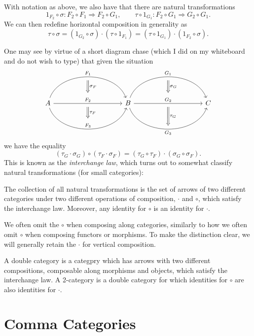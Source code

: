 With notation as above, we also have that there are natural transformations
\[
	1_{F_2} \circ \sigma  : F_2\circ F_1 \Rightarrow F_2\circ G_1,\qquad \tau \circ 1_{G_1} : F_2\circ G_1 \Rightarrow G_2\circ G_1
.\]
We can then redefine horizontal composition in generality as
\[
	\tau \circ \sigma =(1_{G_2} \circ \sigma )\cdot (\tau \circ 1_{F_1} )=(\tau \circ 1_{G_1} )\cdot (1_{F_2} \circ \sigma )
.\]

One may see by virtue of a short diagram chase (which I did on my whiteboard and do not wish to type) that given the situation
\[\begin{tikzcd}[row sep = 5em, column sep = 10em]
	A\ar[bend left=70, " F_1 "{name=F1}, r] \ar[" F_2 "{name=F2}, r] \ar[bend right=70, " F_3 "{name=F3}, r]  & B \ar[" G_1 "{name=G1}, bend left=70, r] \ar[" G_2 "{name=G2}, r] \ar[" G_3 "'{name=G3}, bend right=70, r]  & C
	\arrow[from=F1, to=F2, Rightarrow, " \sigma_F ", shorten=5pt]
	\arrow[from=F2, to=F3, Rightarrow, " \tau_F ", shorten=5pt]
	\arrow[from=G1, to=G2, Rightarrow, " \sigma_G ", shorten=5pt]
	\arrow[from=G2, to=G3, Rightarrow, " \tau _G ", shorten=5pt]
\end{tikzcd}\]
we have the equality
\[
	(\tau _G \cdot \sigma _G)\circ (\tau _F\cdot \sigma _F)=(\tau _G\circ \tau _F)\cdot (\sigma _G\circ \sigma _F)
.\]
This is known as the \emph{interchange law}, which turns out to somewhat classify natural transformations (for small categories):

\begin{theorem}\label{thm:1}
	The collection of all natural transformations is the set of arrows of two different categories under two different operations of composition, $\cdot $ and $\circ $, which satisfy the interchange law. Moreover, any identity for $\circ $ is an identity for $\cdot $.
\end{theorem}

We often omit the $\circ $ when composing along categories, similarly to how we often omit $\circ $ when composing functors or morphisms. To make the distinction clear, we will generally retain the $\cdot $ for vertical composition.

A double category is a categpry which has arrows with two different compositions, composable along morphisms and objects, which satisfy the interchange law. A 2-category is a double category for which identities for $\circ $ are also identities for $\cdot $.

\section{Comma Categories}

